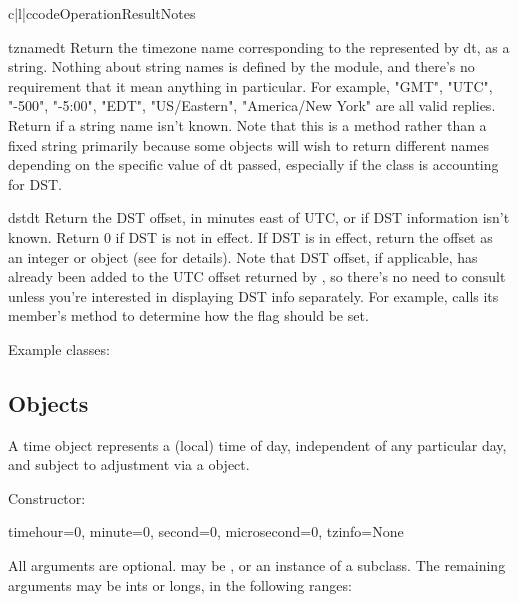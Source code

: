 \begin{tableiii}{c|l|c}{code}{Operation}{Result}{Notes}
\begin{methoddesc}{tzname}{dt}
    Return the timezone name corresponding to the  represented
    by dt, as a string.  Nothing about string names is defined by the
     module, and there's no requirement that it mean anything
    in particular.  For example, "GMT", "UTC", "-500", "-5:00", "EDT",
    "US/Eastern", "America/New York" are all valid replies.  Return
     if a string name isn't known.  Note that this is a method
    rather than a fixed string primarily because some  objects
    will wish to return different names depending on the specific value
    of dt passed, especially if the  class is accounting for DST.
\end{methoddesc}

\begin{methoddesc}{dst}{dt}
    Return the DST offset, in minutes east of UTC, or  if
    DST information isn't known.  Return 0 if DST is not in effect.
    If DST is in effect, return the offset as an integer or
     object (see  for details).
    Note that DST offset, if applicable, has
    already been added to the UTC offset returned by
    , so there's no need to consult 
    unless you're interested in displaying DST info separately.  For
    example,  calls its 
    member's  method to determine how the
     flag should be set.
\end{methoddesc}

Example  classes:




\subsection{ Objects \label{datetime-timetz}}

A time object represents a (local) time of day, independent of any
particular day, and subject to adjustment via a  object.

Constructor:

\begin{funcdesc}{time}{hour=0, minute=0, second=0, microsecond=0, tzinfo=None}

    All arguments are optional.   may be , or
    an instance of a  subclass.  The remaining arguments
    may be ints or longs, in the following ranges:


\end{funcdesc}
\end{tableiii}

